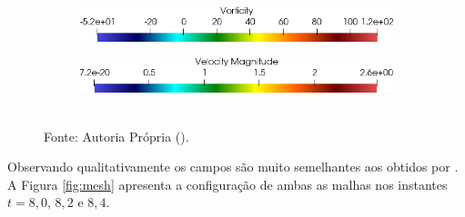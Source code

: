 \begin{figure}[h!]
\begin{subfigure}{.49\linewidth}
    \end{subfigure}
    \caption*{Instante $t=8,8$.}
    \begin{subfigure}{.49\linewidth}
        \centering
        \includegraphics[width=\linewidth]{Figuras/rotating-airfoil/lvort.png}
    \end{subfigure}
    \begin{subfigure}{.49\linewidth}
        \centering
        \includegraphics[width=\linewidth]{Figuras/rotating-airfoil/lstr.png}
    \end{subfigure}
    \\Fonte: Autoria Própria (\the\year).
    \label{fig:vort}
\end{figure}

Observando qualitativamente os campos são muito semelhantes aos obtidos por . A Figura \ref{fig:mesh} apresenta a configuração de ambas as malhas nos instantes $t=8,0$, $8,2$ e $8,4$.

